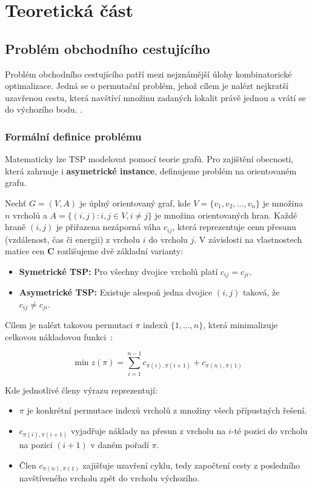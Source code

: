 \chapter{Teoretická část}

\section{Problém obchodního cestujícího}
Problém obchodního cestujícího patří mezi nejznámější úlohy kombinatorické optimalizace. Jedná se o permutační problém, jehož cílem je nalézt nejkratší uzavřenou cestu, která navštíví množinu zadaných lokalit právě jednou a vrátí se do výchozího bodu. \cite{jancar_vsb_ti_skript}.

\subsection{Formální definice problému}

Matematicky lze TSP modelovat pomocí teorie grafů. Pro zajištění obecnosti, která zahrnuje i \textbf{asymetrické instance}, definujeme problém na orientovaném grafu. 

Nechť $G = (V, A)$ je úplný orientovaný graf, kde $V = \{v_1, v_2, \dots, v_n\}$ je množina $n$ vrcholů a $A = \{(i, j) : i, j \in V, i \neq j\}$ je množina orientovaných hran. Každé hraně $(i, j)$ je přiřazena nezáporná váha $c_{ij}$, která reprezentuje cenu přesunu (vzdálenost, čas či energii) z vrcholu $i$ do vrcholu $j$. V závislosti na vlastnostech matice cen $\mathbf{C}$ rozlišujeme dvě základní varianty:
\begin{itemize}
    \item \textbf{Symetrické TSP:} Pro všechny dvojice vrcholů platí $c_{ij} = c_{ji}$.
    \item \textbf{Asymetrické TSP:} Existuje alespoň jedna dvojice $(i, j)$ taková, že $c_{ij} \neq c_{ji}$.
\end{itemize}

Cílem je nalézt takovou permutaci $\pi$ indexů $\{1, \dots, n\}$, která minimalizuje celkovou nákladovou funkci~\cite{reinelt1994tsplib}:

\begin{equation}
    \min z(\pi) = \sum_{i=1}^{n-1} c_{\pi(i), \pi(i+1)} + c_{\pi(n), \pi(1)}
\end{equation}

Kde jednotlivé členy výrazu reprezentují:
\begin{itemize}
    \item $\pi$ je konkrétní permutace indexů vrcholů z množiny všech přípustných řešení.
    \item $c_{\pi(i), \pi(i+1)}$ vyjadřuje náklady na přesun z vrcholu na $i$-té pozici do vrcholu na pozici $(i+1)$ v daném pořadí $\pi$.
    \item Člen $c_{\pi(n), \pi(1)}$ zajišťuje uzavření cyklu, tedy započtení cesty z posledního navštíveného vrcholu zpět do vrcholu výchozího.
\end{itemize}

